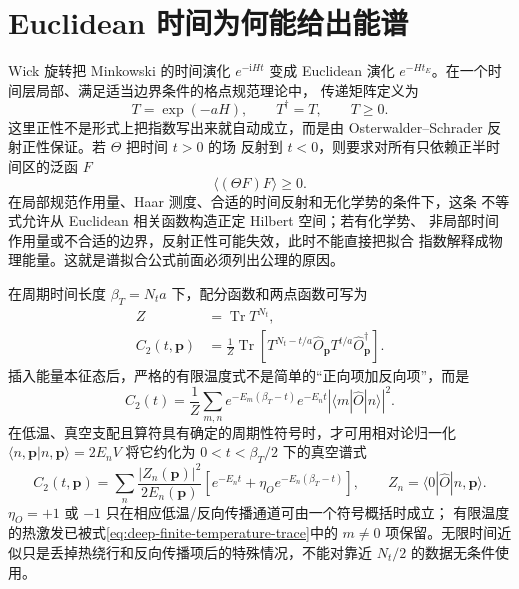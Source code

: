 \documentclass[UTF8,11pt,oneside]{ctexbook}
\begin{document}
\section{Euclidean 时间为何能给出能谱}

Wick 旋转把 Minkowski 的时间演化 \(e^{-\mathrm{i}Ht}\) 变成 Euclidean
演化 \(e^{-Ht_E}\)。在一个时间层局部、满足适当边界条件的格点规范理论中，
传递矩阵定义为
\begin{equation}
 T=\exp(-aH),\qquad T^\dagger=T,\qquad T\ge0 .
 \label{eq:deep-transfer-matrix}
\end{equation}
这里正性不是形式上把指数写出来就自动成立，而是由
Osterwalder--Schrader 反射正性保证。若 \(\Theta\) 把时间 \(t>0\) 的场
反射到 \(t<0\)，则要求对所有只依赖正半时间区的泛函 \(F\)
\begin{equation}
 \langle(\Theta F)F\rangle\ge0 .
 \label{eq:deep-reflection-positivity}
\end{equation}
在局部规范作用量、Haar 测度、合适的时间反射和无化学势的条件下，这条
不等式允许从 Euclidean 相关函数构造正定 Hilbert 空间；若有化学势、
非局部时间作用量或不合适的边界，反射正性可能失效，此时不能直接把拟合
指数解释成物理能量。这就是谱拟合公式前面必须列出公理的原因。

在周期时间长度 \(\beta_T=N_ta\) 下，配分函数和两点函数可写为
\begin{align}
 Z&=\operatorname{Tr}T^{N_t},\\
 C_2(t,\boldsymbol p)
 &=\frac1Z\operatorname{Tr}\left[
 T^{N_t-t/a}\widehat O_{\boldsymbol p}
 T^{t/a}\widehat O_{\boldsymbol p}^\dagger\right].
 \label{eq:deep-trace-correlator}
\end{align}
插入能量本征态后，严格的有限温度式不是简单的“正向项加反向项”，而是
\begin{equation}
 C_2(t)=\frac1Z\sum_{m,n}e^{-E_m(\beta_T-t)}e^{-E_nt}
 \left|\langle m|\widehat O|n\rangle\right|^2 .
 \label{eq:deep-finite-temperature-trace}
\end{equation}
在低温、真空支配且算符具有确定的周期性符号时，才可用相对论归一化
\(\langle n,\boldsymbol p|n,\boldsymbol p\rangle=2E_nV\) 将它约化为
\(0<t<\beta_T/2\) 下的真空谱式
\begin{equation}
 C_2(t,\boldsymbol p)=\sum_n
 \frac{|Z_n(\boldsymbol p)|^2}{2E_n(\boldsymbol p)}
 \left[e^{-E_nt}+\eta_Oe^{-E_n(\beta_T-t)}\right],
 \qquad Z_n=\langle0|\widehat O|n,\boldsymbol p\rangle .
 \label{eq:deep-finite-time-spectrum}
\end{equation}
\(\eta_O=+1\) 或 \(-1\) 只在相应低温/反向传播通道可由一个符号概括时成立；
有限温度的热激发已被式\eqref{eq:deep-finite-temperature-trace}中的 \(m\ne0\)
项保留。无限时间近似只是丢掉热绕行和反向传播项后的特殊情况，不能对靠近
\(N_t/2\) 的数据无条件使用。
\end{document}
